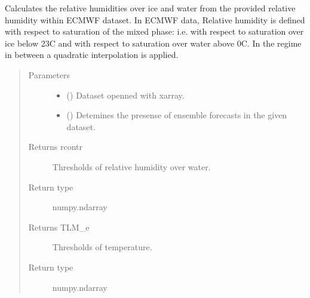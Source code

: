 \documentclass[a4paper,11pt,english]{sphinxmanual}
\begin{document}
\begin{fulllineitems}
\label{\detokenize{modules:envlib.contrail.get_relative_hum}}
Calculates the relative humidities over ice and water from the provided relative humidity within ECMWF
dataset. In ECMWF data, Relative humidity is defined with respect to saturation of the mixed phase: i.e. with
respect to saturation over ice below \sphinxhyphen{}23C and with respect to saturation over water above 0C. In the regime in
between a quadratic interpolation is applied.
\begin{quote}\begin{description}
\item[{Parameters}] \leavevmode\begin{itemize}
\item {} 
 () \textendash{} Dataset openned with xarray.

\item {} 
 () \textendash{} Detemines the presense of ensemble forecasts in the given dataset.

\end{itemize}

\item[{Returns rcontr}] \leavevmode
Thresholds of relative humidity over water.

\item[{Return type}] \leavevmode
numpy.ndarray

\item[{Returns TLM\_e}] \leavevmode
Thresholds of temperature.

\item[{Return type}] \leavevmode
numpy.ndarray

\end{description}\end{quote}

\end{fulllineitems}

\end{document}
